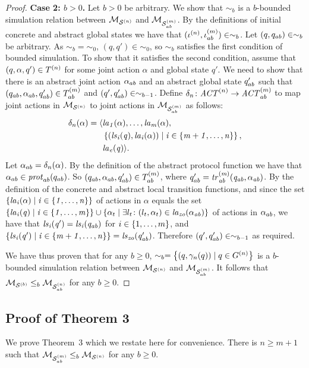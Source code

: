 \documentclass{article}
\newenvironment{customthm}[1]
  {\renewcommand\theinnercustomthm{#1}\innercustomthm}
  {\endinnercustomthm}
\begin{document}
\begin{proof}
{\bf Case 2: $b >0$.} Let $b > 0$ be arbitrary. 
     We
    show that $\sim_{b}$ is a $b$-bounded simulation relation  between
    $\mathcal{M}_{\mathcal{S}^{(n)}}$ and $\mathcal{M}_{\mathcal{S}_{ab}^{(m)}}$.  By the definitions of initial concrete and
    abstract global states we have that $(\iota^{({n})}, \iota^{({m})}_{ab}) \in
    \sim_{b}$.  Let $(q, q_{ab}) \in \sim_b$ be arbitrary. As $\sim_{b} =
    \sim_0$, $(q, q') \in \sim_0$, so $\sim_{b}$ satisfies the
    first condition of bounded simulation. To show that
    it satisfies the second condition,  assume that $(q, \alpha, q') \in
    T^{(n)}$ for some joint action $\alpha$ and global state $q'$. We need
    to show that there is an abstract joint action $\alpha_{ab}$ and an abstract
    global state $q_{ab}'$ such that $(q_{ab}, \alpha_{ab}, q_{ab}') \in
    T^{(m)}_{ab}$ and $(q', q_{ab}') \in \sim_{b-1}$.  Define $\delta_n \colon
    \mathit{ACT}^{(n)} \rightarrow \mathit{ACT}^{(m)}_{ab}$ to map joint actions in $\mathcal{M}_{\mathcal{S}^{(n)}}$
    to joint actions in $\mathcal{M}_{\mathcal{S}_{ab}^{(m)}}$ as follows:
\begin{align*}
  \delta_n(\alpha) =  \langle &\it{la}_{1}({\alpha}), \ldots, \it{la}_{m}({\alpha}), \\
    &\left \{ (\it{ls}_{i}(q), \it{la}_{i}({\alpha})) \mid i \in \left \{ m + 1, \ldots, n \right \} \right \}, \\
  &\it{la}_{e}({q})  \rangle.
\end{align*}
Let $\alpha_{ab} = \delta_n(\alpha)$. By the definition of the abstract protocol
function we have that $\alpha_{ab} \in \mathit{prot}_{ab}(q_{ab})$. So $(q_{ab},
\alpha_{ab}, q_{ab}') \in T^{(m)}_{ab}$, where $q_{ab}' = \it{tr}^{(m)}_{ab}
(q_{ab}, \alpha_{ab})$. By the definition of the concrete and abstract local
transition functions, and since the set $\left \{ \it{la}_{i}({\alpha}) \mid i \in
\left \{ 1,\ldots,n \right \} \right \}$ of actions in $\alpha$ equals the set $\left \{ \it{la}_{i}({q}) \mid i
\in \left \{ 1,\ldots,m \right \} \right \} \cup \left \{ \alpha_t \mid \exists l_t \colon (l_t, \alpha_t)
\in \it{la}_{zo}({\alpha_{ab}}) \right \}$ of actions in $\alpha_{ab}$, we have that $\it{ls}_{i}(q') =
\it{ls}_{i}(q_{ab})$ for $i \in \left \{ 1,\ldots,m \right \}$, and $\left \{ \it{ls}_{i}(q') \mid i \in
\left \{ m+1,\ldots,n \right \} \right \} = \it{ls}_{zo}(q_{ab}')$.  Therefore $(q', q_{ab}') \in
    \sim_{b-1}$ as required.

We have thus proven that for any $b \geq 0$, $\sim_b = \left \{ (q, \gamma_n(q))
    \mid q \in G^{(n)}  \right \}$ is a $b$-bounded simulation relation between
    $\mathcal{M}_{\mathcal{S}^{(n)}}$ and $\mathcal{M}_{\mathcal{S}_{ab}^{(m)}}$. It follows that $\mathcal{M}_{\mathcal{S}^{(b)}} \leq_b \mathcal{M}_{\mathcal{S}_{ab}^{(n)}}$ for any
    $b \geq 0$.

\end{proof}


\subsection*{Proof of Theorem 3}
We prove Theorem~3 which we restate here for convenience.
\begin{customthm}{3}
There is $n \geq m+1$ such that $\mathcal{M}_{\mathcal{S}_{ab}^{(m)}} \leq_b \mathcal{M}_{\mathcal{S}^{(n)}}$ for any $b \geq 0$.
\end{customthm}
\end{document}
